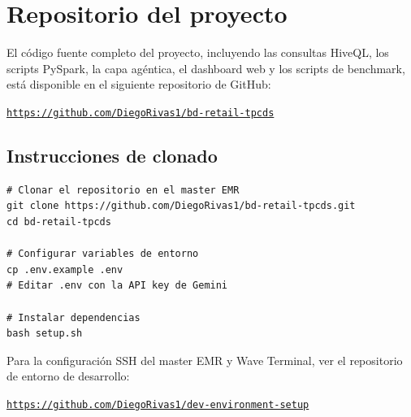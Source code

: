 
\section{Repositorio del proyecto}

El código fuente completo del proyecto, incluyendo las consultas HiveQL, los scripts
PySpark, la capa agéntica, el dashboard web y los scripts de benchmark, está disponible
en el siguiente repositorio de GitHub:

\vspace{0.5cm}

\begin{center}
    \large
    \href{https://github.com/DiegoRivas1/bd-retail-tpcds}{%
        \texttt{https://github.com/DiegoRivas1/bd-retail-tpcds}
    }
\end{center}

\vspace{1cm}

\subsection*{Instrucciones de clonado}

\begin{lstlisting}[style=bash]
# Clonar el repositorio en el master EMR
git clone https://github.com/DiegoRivas1/bd-retail-tpcds.git
cd bd-retail-tpcds

# Configurar variables de entorno
cp .env.example .env
# Editar .env con la API key de Gemini

# Instalar dependencias
bash setup.sh
\end{lstlisting}

\vspace{0.5cm}

Para la configuración SSH del master EMR y Wave Terminal, ver el repositorio
de entorno de desarrollo:

\begin{center}
    \href{https://github.com/DiegoRivas1/dev-environment-setup}{%
        \texttt{https://github.com/DiegoRivas1/dev-environment-setup}
    }
\end{center}
